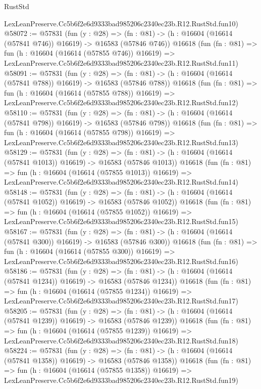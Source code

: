 \begin{lexlean}{RustStd}
\begin{coremodule}
    LexLeanPreserve.Cc5b6f2e6d9333bad985206c2340ec23b.R12.RustStd.fun10)
@58072 := @57831
    (fun (y : @28) =>
    (fn : @81) -> (h : @16604 (@16614 (@57841 @746)) @16619) -> @16583 (@57846 @746))
    @16618
    (fun (fn : @81) =>
    fun (h : @16604 (@16614 (@57855 @746)) @16619) =>
    LexLeanPreserve.Cc5b6f2e6d9333bad985206c2340ec23b.R12.RustStd.fun11)
@58091 := @57831
    (fun (y : @28) =>
    (fn : @81) -> (h : @16604 (@16614 (@57841 @788)) @16619) -> @16583 (@57846 @788))
    @16618
    (fun (fn : @81) =>
    fun (h : @16604 (@16614 (@57855 @788)) @16619) =>
    LexLeanPreserve.Cc5b6f2e6d9333bad985206c2340ec23b.R12.RustStd.fun12)
@58110 := @57831
    (fun (y : @28) =>
    (fn : @81) -> (h : @16604 (@16614 (@57841 @798)) @16619) -> @16583 (@57846 @798))
    @16618
    (fun (fn : @81) =>
    fun (h : @16604 (@16614 (@57855 @798)) @16619) =>
    LexLeanPreserve.Cc5b6f2e6d9333bad985206c2340ec23b.R12.RustStd.fun13)
@58129 := @57831
    (fun (y : @28) =>
    (fn : @81) -> (h : @16604 (@16614 (@57841 @1013)) @16619) -> @16583 (@57846 @1013))
    @16618
    (fun (fn : @81) =>
    fun (h : @16604 (@16614 (@57855 @1013)) @16619) =>
    LexLeanPreserve.Cc5b6f2e6d9333bad985206c2340ec23b.R12.RustStd.fun14)
@58148 := @57831
    (fun (y : @28) =>
    (fn : @81) -> (h : @16604 (@16614 (@57841 @1052)) @16619) -> @16583 (@57846 @1052))
    @16618
    (fun (fn : @81) =>
    fun (h : @16604 (@16614 (@57855 @1052)) @16619) =>
    LexLeanPreserve.Cc5b6f2e6d9333bad985206c2340ec23b.R12.RustStd.fun15)
@58167 := @57831
    (fun (y : @28) =>
    (fn : @81) -> (h : @16604 (@16614 (@57841 @300)) @16619) -> @16583 (@57846 @300))
    @16618
    (fun (fn : @81) =>
    fun (h : @16604 (@16614 (@57855 @300)) @16619) =>
    LexLeanPreserve.Cc5b6f2e6d9333bad985206c2340ec23b.R12.RustStd.fun16)
@58186 := @57831
    (fun (y : @28) =>
    (fn : @81) -> (h : @16604 (@16614 (@57841 @1234)) @16619) -> @16583 (@57846 @1234))
    @16618
    (fun (fn : @81) =>
    fun (h : @16604 (@16614 (@57855 @1234)) @16619) =>
    LexLeanPreserve.Cc5b6f2e6d9333bad985206c2340ec23b.R12.RustStd.fun17)
@58205 := @57831
    (fun (y : @28) =>
    (fn : @81) -> (h : @16604 (@16614 (@57841 @1239)) @16619) -> @16583 (@57846 @1239))
    @16618
    (fun (fn : @81) =>
    fun (h : @16604 (@16614 (@57855 @1239)) @16619) =>
    LexLeanPreserve.Cc5b6f2e6d9333bad985206c2340ec23b.R12.RustStd.fun18)
@58224 := @57831
    (fun (y : @28) =>
    (fn : @81) -> (h : @16604 (@16614 (@57841 @1358)) @16619) -> @16583 (@57846 @1358))
    @16618
    (fun (fn : @81) =>
    fun (h : @16604 (@16614 (@57855 @1358)) @16619) =>
    LexLeanPreserve.Cc5b6f2e6d9333bad985206c2340ec23b.R12.RustStd.fun19)

\end{coremodule}
\end{lexlean}
